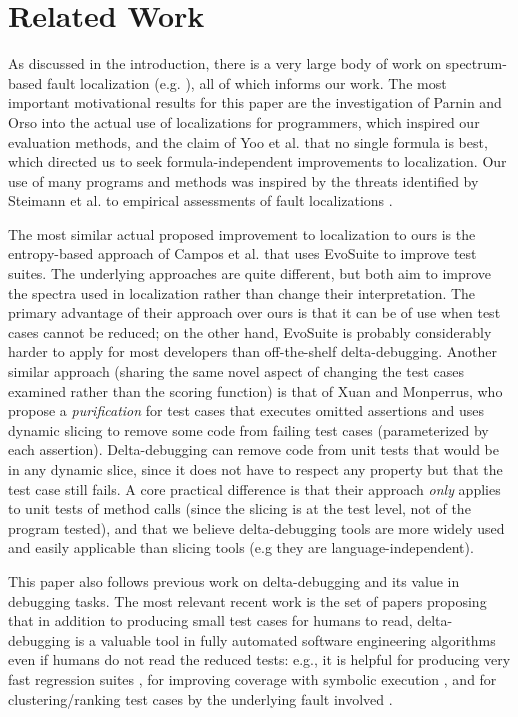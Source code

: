 \section{Related Work}

As discussed in the introduction, there is a very large body of work
on spectrum-based fault localization
(e.g. \cite{Tarantula,Ochai,AMPLE,Pinpoint,StatDebug,StatDebug2,EmpirReduce,Abreu:2006:PRDC,Santelices:ICSE:2009,Entropy,CCT}),
all of which informs our work.  The most important motivational
results for this paper are the investigation of Parnin and Orso
\cite{AutoHelp} into the actual use of localizations for programmers,
which inspired our evaluation methods, and the claim of Yoo et
al. \cite{yoo2014no} that no single formula is best, which directed us
to seek formula-independent improvements to localization.  Our use of
many programs and methods was inspired by the threats identified by
Steimann et al. to empirical assessments of fault localizations
\cite{Threats}. 

The most similar actual proposed improvement to localization to ours is the
entropy-based approach of Campos et al. \cite{Entropy} that uses
EvoSuite \cite{FA11} to improve test suites.  The underlying
approaches are quite different, but both aim to improve the spectra
used in localization rather than change their interpretation.  The
primary advantage of their approach over ours is that it can be of use
when test cases cannot be reduced; on the other hand, EvoSuite is
probably considerably harder to apply for most developers than
off-the-shelf delta-debugging.
Another similar approach (sharing the same novel aspect of changing
the test cases examined rather than the scoring function) is that of
Xuan and Monperrus, who propose a \emph{purification} for test cases
\cite{PureTest} that executes omitted assertions and uses dynamic
slicing \cite{DynamicSlicing} to remove some code from failing test
cases (parameterized by each assertion). Delta-debugging can remove code from unit
tests that would be in any dynamic slice, since it does not have to
respect any property but that the test case still fails.  A core
practical difference is that their approach \emph{only} applies to
unit tests of method calls (since the slicing is at the test level,
not of the program tested), and that we believe delta-debugging tools
are more widely used and easily applicable than slicing tools (e.g
they are language-independent).

This paper also follows previous work on delta-debugging
\cite{DD,DDISSTA,Yesterday} and its value in debugging tasks.  The
most relevant recent work is the set of papers proposing that in
addition to producing small test cases for humans to read,
delta-debugging is a valuable tool in fully automated software
engineering algorithms even if humans do not read the reduced tests:
e.g., it is helpful for producing very fast regression suites
\cite{icst2014}, for improving coverage with symbolic execution
\cite{issta14}, and for clustering/ranking test cases by the
underlying fault involved \cite{PLDI13}.
